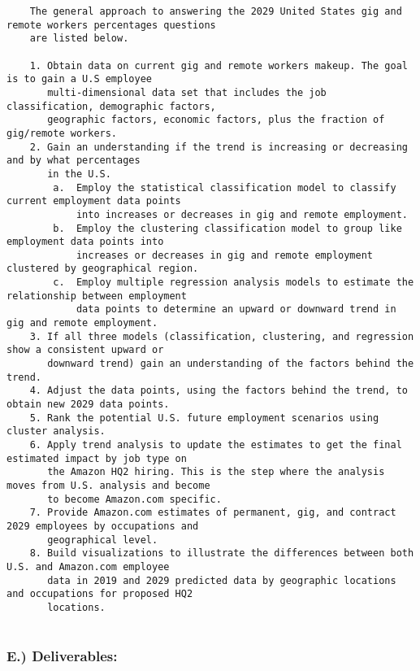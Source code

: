 \documentclass[]{article}
\begin{document}
\begin{verbatim}
    The general approach to answering the 2029 United States gig and remote workers percentages questions 
    are listed below.

    1. Obtain data on current gig and remote workers makeup. The goal is to gain a U.S employee 
       multi-dimensional data set that includes the job classification, demographic factors, 
       geographic factors, economic factors, plus the fraction of gig/remote workers.  
    2. Gain an understanding if the trend is increasing or decreasing and by what percentages 
       in the U.S.
        a.  Employ the statistical classification model to classify current employment data points 
            into increases or decreases in gig and remote employment. 
        b.  Employ the clustering classification model to group like employment data points into 
            increases or decreases in gig and remote employment clustered by geographical region. 
        c.  Employ multiple regression analysis models to estimate the relationship between employment 
            data points to determine an upward or downward trend in gig and remote employment.
    3. If all three models (classification, clustering, and regression show a consistent upward or 
       downward trend) gain an understanding of the factors behind the trend.
    4. Adjust the data points, using the factors behind the trend, to obtain new 2029 data points. 
    5. Rank the potential U.S. future employment scenarios using cluster analysis.
    6. Apply trend analysis to update the estimates to get the final estimated impact by job type on 
       the Amazon HQ2 hiring. This is the step where the analysis moves from U.S. analysis and become 
       to become Amazon.com specific.
    7. Provide Amazon.com estimates of permanent, gig, and contract 2029 employees by occupations and 
       geographical level.
    8. Build visualizations to illustrate the differences between both U.S. and Amazon.com employee 
       data in 2019 and 2029 predicted data by geographic locations and occupations for proposed HQ2 
       locations.
       
\end{verbatim}

\subsubsection{E.) Deliverables:}\label{e.-deliverables}
\end{document}
